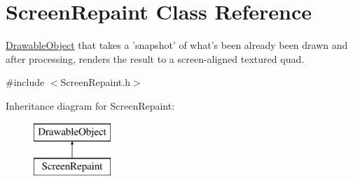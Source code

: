 \hypertarget{class_screen_repaint}{\section{Screen\-Repaint Class Reference}
\label{class_screen_repaint}
}


\hyperlink{class_drawable_object}{Drawable\-Object} that takes a 'snapshot' of what's been already been drawn and after processing, renders the result to a screen-\/aligned textured quad.  




{\ttfamily \#include $<$Screen\-Repaint.\-h$>$}

Inheritance diagram for Screen\-Repaint\-:\begin{figure}[H]
\begin{center}
\leavevmode
\includegraphics[height=2.000000cm]{class_screen_repaint}
\end{center}
\end{figure}
